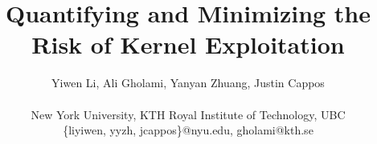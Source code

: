 \documentclass[letterpaper,twocolumn,10pt]{article}
\begin{document}




\title{Quantifying and Minimizing the Risk of Kernel Exploitation}

\author{
{\rm Yiwen Li, Ali Gholami, Yanyan Zhuang, Justin Cappos}\\\\
New York University, KTH Royal Institute of Technology, UBC \\
\{liyiwen, yyzh, jcappos\}@nyu.edu, gholami@kth.se
} %


\maketitle



















{
\footnotesize 


}



\end{document}
